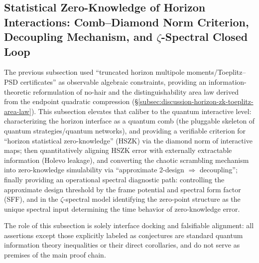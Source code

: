 \subsection{Statistical Zero-Knowledge of Horizon Interactions: Comb--Diamond Norm Criterion, Decoupling Mechanism, and \texorpdfstring{$\zeta$}{zeta}-Spectral Closed Loop}\label{subsec:discussion-horizon-hszk-comb-sff-zeta}
The previous subsection used ``truncated horizon multipole moments/Toeplitz--PSD certificates'' as observable algebraic constraints, providing an information-theoretic reformulation of no-hair and the distinguishability area law derived from the endpoint quadratic compression (\S\ref{subsec:discussion-horizon-zk-toeplitz-area-law}).
This subsection elevates that caliber to the quantum interactive level: characterizing the horizon interface as a quantum comb (the pluggable skeleton of quantum strategies/quantum networks), and providing a verifiable criterion for ``horizon statistical zero-knowledge'' (HSZK) via the diamond norm of interactive maps; then quantitatively aligning HSZK error with externally extractable information (Holevo leakage), and converting the chaotic scrambling mechanism into zero-knowledge simulability via ``approximate 2-design \(\Rightarrow\) decoupling''; finally providing an operational spectral diagnostic path: controlling the approximate design threshold by the frame potential and spectral form factor (SFF), and in the \(\zeta\)-spectral model identifying the zero-point structure as the unique spectral input determining the time behavior of zero-knowledge error.
\par
The role of this subsection is solely interface docking and falsifiable alignment: all assertions except those explicitly labeled as conjectures are standard quantum information theory inequalities or their direct corollaries, and do not serve as premises of the main proof chain.
\par

